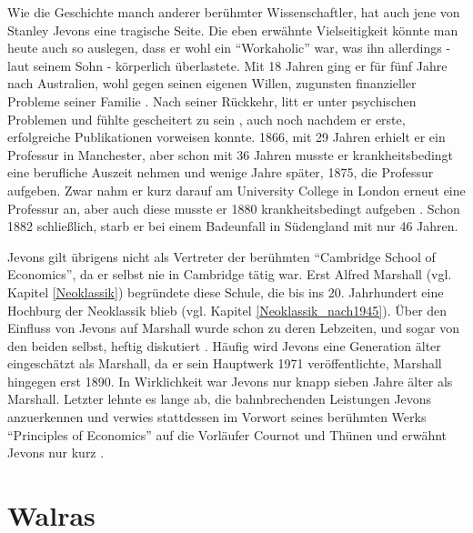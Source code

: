 Wie die Geschichte manch anderer berühmter Wissenschaftler, hat auch jene von Stanley Jevons eine tragische Seite. Die eben erwähnte Vielseitigkeit könnte man heute auch so auslegen, dass er wohl ein "`Workaholic"' war, was ihn allerdings - laut seinem Sohn \parencite[S. 230]{Jevons1934} - körperlich überlastete. Mit 18 Jahren ging er für fünf Jahre nach Australien, wohl gegen seinen eigenen Willen, zugunsten finanzieller Probleme seiner Familie \parencite[S. 518]{Keynes1936a}. Nach seiner Rückkehr, litt er unter psychischen Problemen und fühlte gescheitert zu sein \parencite[S. 527]{Keynes1936a}, auch noch nachdem er erste, erfolgreiche Publikationen vorweisen konnte.  1866, mit 29 Jahren erhielt er ein Professur in Manchester, aber schon mit 36 Jahren musste er krankheitsbedingt eine berufliche Auszeit nehmen und wenige Jahre später, 1875, die Professur aufgeben. Zwar nahm er kurz darauf am University College in London erneut eine Professur an, aber auch diese musste er 1880 krankheitsbedingt aufgeben \parencite[S. 230]{Jevons1934}. Schon 1882 schließlich, starb er bei einem Badeunfall in Südengland mit nur 46 Jahren.

Jevons gilt übrigens nicht als Vertreter der berühmten "`Cambridge School of Economics"', da er selbst nie in Cambridge tätig war. Erst Alfred Marshall (vgl. Kapitel \ref{Neoklassik}) begründete diese Schule, die bis ins 20. Jahrhundert eine Hochburg der Neoklassik blieb (vgl. Kapitel \ref{Neoklassik_nach1945}). Über den Einfluss von Jevons auf Marshall wurde schon zu deren Lebzeiten, und sogar von den beiden selbst, heftig diskutiert \parencite[S. 536]{Keynes1936a}. Häufig wird Jevons eine Generation älter eingeschätzt als Marshall, da er sein Hauptwerk 1971 veröffentlichte, Marshall hingegen erst 1890. In Wirklichkeit war Jevons nur knapp sieben Jahre älter als Marshall. Letzter lehnte es lange ab, die bahnbrechenden Leistungen Jevons anzuerkennen \parencite[S. 535]{Keynes1936a} und verwies stattdessen im Vorwort seines berühmten Werks "`Principles of Economics"' auf die Vorläufer Cournot und Thünen und erwähnt Jevons nur kurz \parencite[S. XXII]{Marshall1890}. 


\section{Walras}
\label{Walras}


